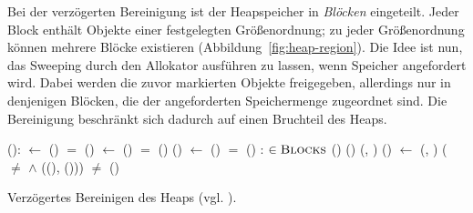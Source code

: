 Bei der verzögerten Bereinigung ist der Heapspeicher in \textit{Blöcken} eingeteilt.
Jeder Block enthält Objekte einer festgelegten Größenordnung; zu jeder Größenordnung können mehrere Blöcke existieren (Abbildung~\ref{fig:heap-region}).
Die Idee ist nun, das Sweeping durch den Allokator ausführen zu lassen, wenn Speicher angefordert wird.
Dabei werden die zuvor markierten Objekte freigegeben, allerdings nur in denjenigen Blöcken, die der angeforderten Speichermenge zugeordnet sind.
Die Bereinigung beschränkt sich dadurch auf einen Bruchteil des Heaps.

\begin{algorithm}[h]
\begin{algorithmic}[1]
	\State {}():
	\State \quad {} $\gets$ ()
	\State \quad \IF {} $=$ \Null
	\State \quad \quad {}()	
	\State \quad \quad {} $\gets$ ()	
	\State \quad \quad \IF {} $=$ \Null
	\State \quad \quad \quad {}()		
	\State \quad \quad \quad {}()	
	\State \quad \quad \quad {} $\gets$ ()	
	\State \quad \quad \quad \IF {} $=$ \Null
	\State \quad \quad \quad \quad {}()
	\State \quad \Return {}
	\Statex
	\State {}:
	\State \quad {}		
	\State \quad \FOREACH {} $\in \textsc{Blocks}$
	\State \quad \quad \IF \NOT {}()
	\State \quad \quad \quad {}()	
	\State \quad \quad \ELSE {}(, )
	\Statex
	\State {}()
	\State \quad \Do
	\State \quad \quad {} $\gets$ (, )
	\State \quad \quad \IF ( $\neq$ \Null $\wedge$ ((), ()))
	\State \quad \quad \quad \Return	{}
	\State \quad \WHILE {} $\neq$ 
	\State \quad {}()	
\end{algorithmic}
\caption[Verzögertes Bereinigen des Heaps]{Verzögertes Bereinigen des Heaps (vgl. \cite[S. 25]{handbook}).}
\label{algo:lazy-sweep}
\end{algorithm}

